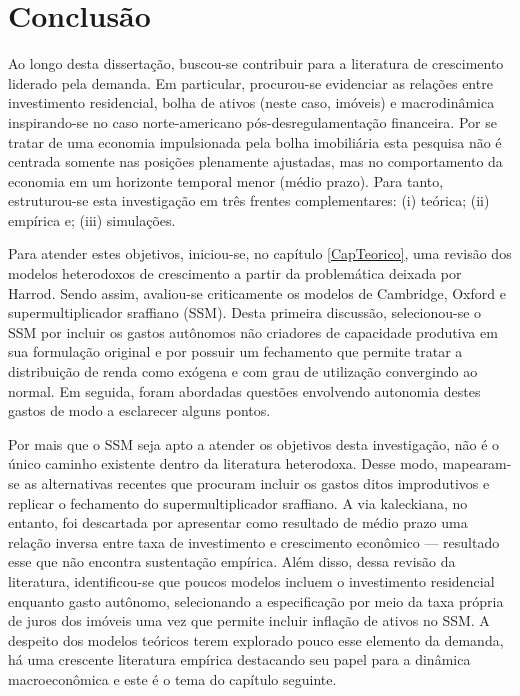 \chapter{Conclusão}

Ao longo desta dissertação, buscou-se contribuir para a literatura de crescimento liderado pela demanda.
Em particular, procurou-se evidenciar as relações entre investimento residencial, bolha de ativos (neste caso, imóveis) e macrodinâmica inspirando-se no caso norte-americano pós-desregulamentação financeira.
Por se tratar de uma economia impulsionada pela bolha imobiliária esta pesquisa não é centrada somente nas posições plenamente ajustadas, mas no comportamento da economia em um horizonte temporal menor (médio prazo).
Para tanto, estruturou-se esta investigação em três frentes complementares: (i) teórica; (ii) empírica e; (iii) simulações.



Para atender estes objetivos, iniciou-se, no capítulo \ref{CapTeorico}, uma revisão dos modelos heterodoxos de crescimento a partir da problemática deixada por Harrod.
Sendo assim, avaliou-se criticamente os modelos de Cambridge, Oxford e supermultiplicador sraffiano (SSM).
Desta primeira discussão, selecionou-se o SSM por incluir os gastos autônomos não criadores de capacidade produtiva em sua formulação original e por possuir um fechamento que permite tratar a distribuição de renda como exógena e com grau de utilização convergindo ao normal.
Em seguida, foram abordadas questões envolvendo autonomia destes gastos de modo a esclarecer alguns pontos.

Por mais que o SSM seja apto a atender os objetivos desta investigação, não é o único caminho existente dentro da literatura heterodoxa.
Desse modo, mapearam-se as alternativas recentes que procuram incluir os gastos ditos improdutivos e replicar o fechamento do supermultiplicador sraffiano.
A via kaleckiana, no entanto, foi descartada por apresentar como resultado de médio prazo uma relação inversa entre taxa de investimento e crescimento econômico --- resultado esse que não encontra sustentação empírica. 
Além disso, dessa revisão da literatura, identificou-se que poucos modelos incluem o investimento residencial enquanto gasto autônomo, selecionando a especificação por meio  da taxa própria de juros dos imóveis uma vez que permite incluir inflação de ativos no  SSM.
A despeito dos modelos teóricos terem explorado pouco
esse elemento da demanda, há uma crescente literatura empírica destacando seu papel para a dinâmica macroeconômica e este é o tema do capítulo seguinte.


